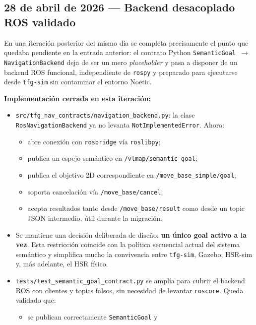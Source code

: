 \documentclass[11pt,a4paper]{article}
\begin{document}
\subsection*{28 de abril de 2026 --- Backend desacoplado ROS validado}

En una iteración posterior del mismo día se completa precisamente el punto que
quedaba pendiente en la entrada anterior: el contrato Python
\texttt{SemanticGoal $\rightarrow$ NavigationBackend} deja de ser un mero
\emph{placeholder} y pasa a disponer de un backend ROS funcional,
independiente de \texttt{rospy} y preparado para ejecutarse desde
\texttt{tfg-sim} sin contaminar el entorno Noetic.

\textbf{Implementación cerrada en esta iteración:}
\begin{itemize}
  \item \texttt{src/tfg\_nav\_contracts/navigation\_backend.py}: la clase
        \texttt{RosNavigationBackend} ya no levanta
        \texttt{NotImplementedError}. Ahora:
        \begin{itemize}
          \item abre conexión con \texttt{rosbridge} vía \texttt{roslibpy};
          \item publica un espejo semántico en
                \texttt{/vlmap/semantic\_goal};
          \item publica el objetivo 2D correspondiente en
                \texttt{/move\_base\_simple/goal};
          \item soporta cancelación vía \texttt{/move\_base/cancel};
          \item acepta resultados tanto desde
                \texttt{/move\_base/result} como desde un topic JSON
                intermedio, útil durante la migración.
        \end{itemize}
  \item Se mantiene una decisión deliberada de diseño:
        \textbf{un único goal activo a la vez}. Esta restricción coincide con
        la política secuencial actual del sistema semántico y simplifica mucho
        la convivencia entre \texttt{tfg-sim}, Gazebo, HSR-sim y, más adelante,
        el HSR físico.
  \item \texttt{tests/test\_semantic\_goal\_contract.py} se amplía para cubrir
        el backend ROS con clientes y topics falsos, sin necesidad de levantar
        \texttt{roscore}. Queda validado que:
        \begin{itemize}
          \item se publican correctamente \texttt{SemanticGoal} y

\end{itemize}
\end{itemize}
\end{document}
